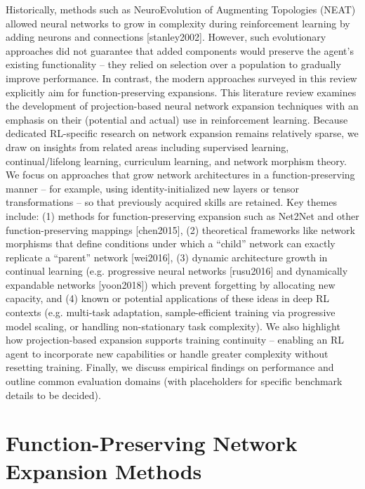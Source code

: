 Historically, methods such as NeuroEvolution of Augmenting Topologies (NEAT) allowed neural networks to grow in complexity during reinforcement learning by adding neurons and connections [stanley2002]. However, such evolutionary approaches did not guarantee that added components would preserve the agent’s existing functionality – they relied on selection over a population to gradually improve performance. In contrast, the modern approaches surveyed in this review explicitly aim for function-preserving expansions. This literature review examines the development of projection-based neural network expansion techniques with an emphasis on their (potential and actual) use in reinforcement learning. Because dedicated RL-specific research on network expansion remains relatively sparse, we draw on insights from related areas including supervised learning, continual/lifelong learning, curriculum learning, and network morphism theory. We focus on approaches that grow network architectures in a function-preserving manner – for example, using identity-initialized new layers or tensor transformations – so that previously acquired skills are retained. Key themes include: (1) methods for function-preserving expansion such as Net2Net and other function-preserving mappings [chen2015], (2) theoretical frameworks like network morphisms that define conditions under which a “child” network can exactly replicate a “parent” network [wei2016], (3) dynamic architecture growth in continual learning (e.g. progressive neural networks [rusu2016] and dynamically expandable networks [yoon2018]) which prevent forgetting by allocating new capacity, and (4) known or potential applications of these ideas in deep RL contexts (e.g. multi-task adaptation, sample-efficient training via progressive model scaling, or handling non-stationary task complexity). We also highlight how projection-based expansion supports training continuity – enabling an RL agent to incorporate new capabilities or handle greater complexity without resetting training. Finally, we discuss empirical findings on performance and outline common evaluation domains (with placeholders for specific benchmark details to be decided).

\section{Function-Preserving Network Expansion Methods}

